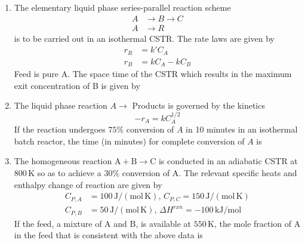 \documentclass[journal,12pt,onecolumn]{IEEEtran}
\theoremstyle{remark}
\begin{document}
\begin{enumerate}
\item The elementary liquid phase series-parallel reaction scheme
\[\begin{aligned}A &\rightarrow B \rightarrow C \\A &\rightarrow R\end{aligned}\]
is to be carried out in an isothermal CSTR. The rate laws are given by
\[\begin{aligned}r_R &= k' C_A \\r_B &= k C_A - k C_B\end{aligned}\]
Feed is pure A. The space time of the CSTR which results in the maximum exit concentration of B is given by
\hfill{}
\begin{enumerate}
\end{enumerate}

\item  The liquid phase reaction $A \rightarrow$ Products is governed by the kinetics
\[-r_A = k C_A^{1/2}\]
If the reaction undergoes $75\%$ conversion of $A$ in 10 minutes in an isothermal batch reactor, the time (in minutes) for complete conversion of $A$ is
\hfill{}
\begin{enumerate}
\end{enumerate}

\item The homogeneous reaction $\mathrm{A + B \rightarrow C}$ is conducted in an adiabatic CSTR at $800 \, \mathrm{K}$ so as to achieve a $30\%$ conversion of A. The relevant specific heats and enthalpy change of reaction are given by
\[\begin{aligned}C_{P,A} &= 100 \, \mathrm{J/(mol \, K)}, \, C_{P,C} = 150 \, \mathrm{J/(mol \, K)} \\C_{P,B} &= 50 \, \mathrm{J/(mol \, K)}, \, \Delta H^{rxn} = -100 \, \mathrm{kJ/mol}\end{aligned}\]
If the feed, a mixture of A and B, is available at $550 \, \mathrm{K}$, the mole fraction of A in the feed that is consistent with the above data is
\hfill{}
\begin{enumerate}
\end{enumerate}


\end{enumerate}
\end{document}
